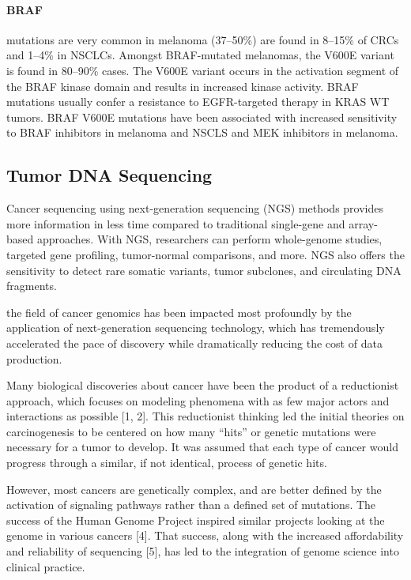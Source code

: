 {{{      \paragraph{BRAF} mutations are very common in melanoma (37--50\%) are
      found in 8--15\% of CRCs and 1--4\% in NSCLCs. Amongst BRAF-mutated
      melanomas, the V600E variant is found in 80--90\% cases. The V600E variant
      occurs in the activation segment of the BRAF kinase domain and results in
      increased kinase activity. BRAF mutations usually confer a resistance to
      EGFR-targeted therapy in KRAS WT tumors. BRAF V600E mutations have been
      associated with increased sensitivity to BRAF inhibitors in melanoma and
      NSCLS and MEK inhibitors in melanoma.

  \subsection{Tumor DNA Sequencing}

    Cancer sequencing using next-generation sequencing (NGS) methods provides
    more information in less time compared to traditional single-gene and
    array-based approaches. With NGS, researchers can perform whole-genome
    studies, targeted gene profiling, tumor-normal comparisons, and more. NGS
    also offers the sensitivity to detect rare somatic variants, tumor
    subclones, and circulating DNA fragments.

    the field of cancer genomics has been impacted most profoundly by the
    application of next-generation sequencing technology, which has
    tremendously accelerated the pace of discovery while dramatically reducing
    the cost of data production.

    Many biological discoveries about cancer have been the product of a reductionist
    approach, which focuses on modeling phenomena with as few major actors and
    interactions as possible [1, 2]. This reductionist thinking led the initial
    theories on carcinogenesis to be centered on how many “hits” or genetic
    mutations were necessary for a tumor to develop. It was assumed that each type
    of cancer would progress through a similar, if not identical, process of genetic
    hits.

    However, most cancers are genetically complex, and are better defined by the
    activation of signaling pathways rather than a defined set of mutations. The
    success of the Human Genome Project inspired similar projects looking at the
    genome in various cancers [4]. That success, along with the increased
    affordability and reliability of sequencing [5], has led to the integration of
    genome science into clinical practice.

}}}
